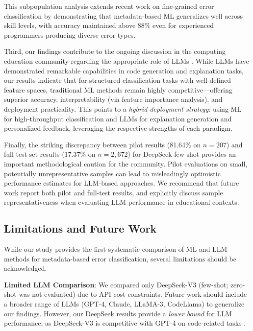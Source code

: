 \documentclass[10pt,a4paper]{article}
\begin{document}
This subpopulation analysis extends recent work on fine-grained error
classification \cite{altadmri2015most} by demonstrating that
metadata-based ML generalizes well across skill levels, with accuracy
maintained above 88\% even for experienced programmers producing diverse
error types.

Third, our findings contribute to the ongoing discussion in the computing
education community regarding the appropriate role of LLMs
\cite{finnie2022robots,kazemitabaar2024impact}. While LLMs have
demonstrated remarkable capabilities in code generation and explanation tasks,
our results indicate that for structured classification tasks with
well-defined feature spaces, traditional ML methods remain highly
competitive---offering superior accuracy, interpretability (via feature
importance analysis), and deployment practicality. This points to a
\textit{hybrid deployment strategy}: using ML for high-throughput
classification and LLMs for explanation generation and personalized
feedback, leveraging the respective strengths of each paradigm.

Finally, the striking discrepancy between pilot results (81.64\% on \(n=207\))
and full test set results (17.37\% on \(n=2,672\)) for DeepSeek few-shot
provides an important methodological caution for the community.
Pilot evaluations on small, potentially unrepresentative samples can
lead to misleadingly optimistic performance estimates for LLM-based
approaches. We recommend that future work report both pilot and full-test
results, and explicitly discuss sample representativeness when evaluating
LLM performance in educational contexts.


\subsection{Limitations and Future Work}

While our study provides the first systematic comparison of ML and LLM methods
for metadata-based error classification, several limitations should be acknowledged.

\textbf{Limited LLM Comparison}: We compared only DeepSeek-V3 (few-shot; zero-shot was not evaluated) due to API cost constraints. Future work should include a broader
range of LLMs (GPT-4, Claude, LLaMA-3, CodeLlama) to generalize our
findings. However, our DeepSeek results provide a \textit{lower bound} for
LLM performance, as DeepSeek-V3 is competitive with GPT-4 on code-related tasks
\cite{deepseek2024technical}.
\end{document}

